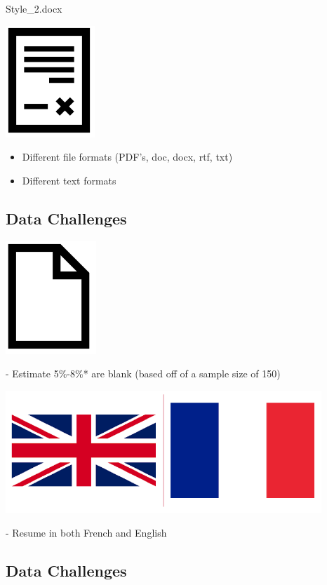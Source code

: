 \documentclass[
]{article}
\providecommand{\tightlist}{%
  \setlength{\itemsep}{0pt}\setlength{\parskip}{0pt}}
\begin{document}
Style\_2.docx

\includegraphics{../img/project_proposal/12_resume_3.png}

\begin{itemize}
\tightlist
\item
  Different file formats (PDF's, doc, docx, rtf, txt)
\item
  Different text formats
\end{itemize}

\hypertarget{data-challenges-1}{%
\subsection{Data Challenges}\label{data-challenges-1}}

\includegraphics{../img/project_proposal/10_resume_blank.png}

- Estimate 5\%-8\%* are blank (based off of a sample size of 150)

\includegraphics[width=4.6875in,height=\textheight]{../img/project_proposal/13_eng_fran.png}

- Resume in both French and English

\hypertarget{data-challenges-2}{%
\subsection{Data Challenges}\label{data-challenges-2}}
\end{document}
